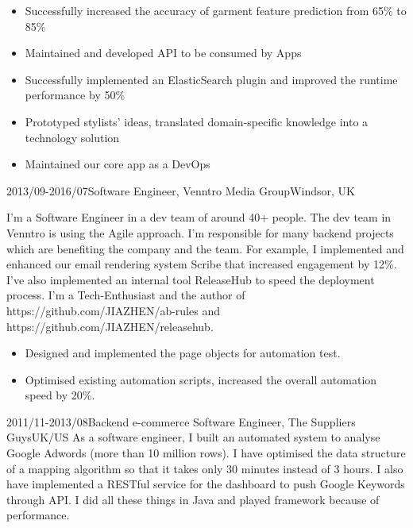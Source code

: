 \documentclass[a4paper]{twentysecondcv-english} %
\begin{document}
\begin{twenty}
{        	\begin{itemize}
                \item Successfully increased the accuracy of garment feature prediction from 65\% to 85\%
                \item Maintained and developed API to be consumed by Apps
                \item Successfully implemented an ElasticSearch plugin and improved the runtime performance by 50\%
                \item Prototyped stylists' ideas, translated domain-specific knowledge into a technology solution
                \item Maintained our core app as a DevOps
            \end{itemize}}
    \twentyitem
	    {2013/09-2016/07}{Software Engineer, Venntro Media Group}{Windsor, UK}
    	{I'm a Software Engineer in a dev team of around 40+ people. The dev team in Venntro is using the Agile approach. I'm responsible for many backend projects which are benefiting the company and the team. For example, I implemented and enhanced our email rendering system Scribe that increased engagement by 12\%. I've also implemented an internal tool ReleaseHub to speed the deployment process. I'm a Tech-Enthusiast and the author of https://github.com/JIAZHEN/ab-rules and https://github.com/JIAZHEN/releasehub.
        	\begin{itemize}
                \item Designed and implemented the page objects for automation test.
                \item Optimised existing automation scripts, increased the overall automation speed by 20\%.
            \end{itemize}}
\end{twenty}

\newpage %
\makesidebar

\begin{twenty} %
    \twentyitem
	    {2011/11-2013/08}{Backend e-commerce Software Engineer, The Suppliers Guys}{UK/US}
    	{As a software engineer, I built an automated system to analyse Google Adwords (more than 10 million rows). I have optimised the data structure of a mapping algorithm so that it takes only 30 minutes instead of 3 hours. I also have implemented a RESTful service for the dashboard to push Google Keywords through API. I did all these things in Java and played framework because of performance.}
\end{twenty}
\end{document}
